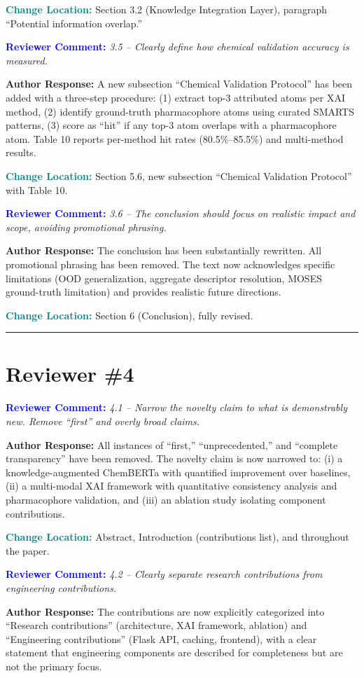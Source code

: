 \documentclass[12pt]{article}
\newcommand{\RC}[1]{\textbf{\textcolor{blue}{Reviewer Comment:}} \textit{#1}\vspace{0.3em}}
\newcommand{\AR}[1]{\textbf{Author Response:} #1\vspace{0.8em}}
\newcommand{\CH}[1]{\textbf{\textcolor{teal}{Change Location:}} #1\vspace{0.5em}}
\begin{document}
\CH{Section 3.2 (Knowledge Integration Layer), paragraph ``Potential information overlap.''}

\bigskip

\RC{3.5 -- Clearly define how chemical validation accuracy is measured.}

\AR{A new subsection ``Chemical Validation Protocol'' has been added with a three-step procedure: (1) extract top-3 attributed atoms per XAI method, (2) identify ground-truth pharmacophore atoms using curated SMARTS patterns, (3) score as ``hit'' if any top-3 atom overlaps with a pharmacophore atom. Table 10 reports per-method hit rates (80.5\%--85.5\%) and multi-method results.}

\CH{Section 5.6, new subsection ``Chemical Validation Protocol'' with Table 10.}

\bigskip

\RC{3.6 -- The conclusion should focus on realistic impact and scope, avoiding promotional phrasing.}

\AR{The conclusion has been substantially rewritten. All promotional phrasing has been removed. The text now acknowledges specific limitations (OOD generalization, aggregate descriptor resolution, MOSES ground-truth limitation) and provides realistic future directions.}

\CH{Section 6 (Conclusion), fully revised.}

\bigskip
\hrule
\bigskip

\section*{Reviewer \#4}

\RC{4.1 -- Narrow the novelty claim to what is demonstrably new. Remove ``first'' and overly broad claims.}

\AR{All instances of ``first,'' ``unprecedented,'' and ``complete transparency'' have been removed. The novelty claim is now narrowed to: (i) a knowledge-augmented ChemBERTa with quantified improvement over baselines, (ii) a multi-modal XAI framework with quantitative consistency analysis and pharmacophore validation, and (iii) an ablation study isolating component contributions.}

\CH{Abstract, Introduction (contributions list), and throughout the paper.}

\bigskip

\RC{4.2 -- Clearly separate research contributions from engineering contributions.}

\AR{The contributions are now explicitly categorized into ``Research contributions'' (architecture, XAI framework, ablation) and ``Engineering contributions'' (Flask API, caching, frontend), with a clear statement that engineering components are described for completeness but are not the primary focus.}
\end{document}
